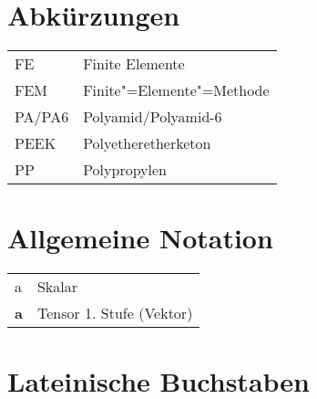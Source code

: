 {\renewcommand*{\arraystretch}{1.2}%

\section*{Abkürzungen}

\begin{longtable}{@{}p{\TabulatorVZ}@{}p{\TabulatorTX+\TabulatorEH+2\tabcolsep}@{}}
FE								& Finite Elemente \\
FEM								& Finite"=Elemente"=Methode \\
PA/PA6						& Polyamid/Polyamid-6 \\
PEEK    	        & Polyetheretherketon \\
PP								& Polypropylen

\end{longtable}

\section*{Allgemeine Notation}

\begin{longtable}{@{}p{\TabulatorVZ}@{}p{\TabulatorTX+\TabulatorEH+2\tabcolsep}@{}}
a									& Skalar \\
\textbf{a}				& Tensor 1. Stufe (Vektor)
\end{longtable}

\section*{Lateinische Buchstaben}

}
